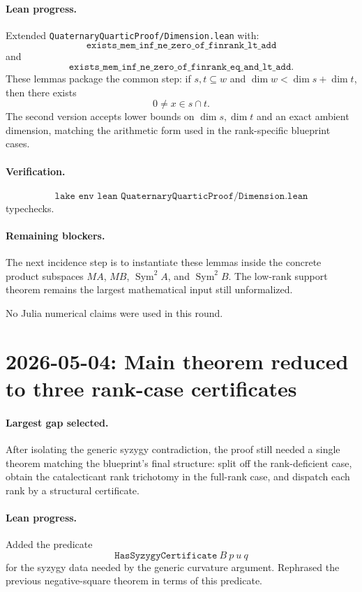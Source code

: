 \documentclass[11pt]{article}
\begin{document}
\paragraph{Lean progress.}
Extended \texttt{QuaternaryQuarticProof/Dimension.lean} with:
\[
\texttt{exists\_mem\_inf\_ne\_zero\_of\_finrank\_lt\_add}
\]
and
\[
\texttt{exists\_mem\_inf\_ne\_zero\_of\_finrank\_eq\_and\_lt\_add}.
\]
These lemmas package the common step:
if \(s,t\subseteq w\) and \(\dim w < \dim s+\dim t\), then there exists
\[
0\ne x\in s\cap t.
\]
The second version accepts lower bounds on \(\dim s,\dim t\) and an exact
ambient dimension, matching the arithmetic form used in the rank-specific
blueprint cases.

\paragraph{Verification.}
\[
\texttt{lake env lean QuaternaryQuarticProof/Dimension.lean}
\]
typechecks.

\paragraph{Remaining blockers.}
The next incidence step is to instantiate these lemmas inside the concrete
product subspaces \(MA\), \(MB\), \(\operatorname{Sym}^2A\), and
\(\operatorname{Sym}^2B\).  The low-rank support theorem remains the largest
mathematical input still unformalized.

No Julia numerical claims were used in this round.

\section*{2026-05-04: Main theorem reduced to three rank-case certificates}

\paragraph{Largest gap selected.}
After isolating the generic syzygy contradiction, the proof still needed a
single theorem matching the blueprint's final structure: split off the
rank-deficient case, obtain the catalecticant rank trichotomy in the full-rank
case, and dispatch each rank by a structural certificate.

\paragraph{Lean progress.}
Added the predicate
\[
\texttt{HasSyzygyCertificate}\ B\ p\ u\ q
\]
for the syzygy data needed by the generic curvature argument.  Rephrased the
previous negative-square theorem in terms of this predicate.
\end{document}
